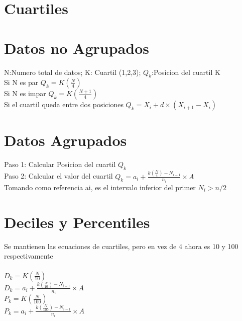 \documentclass[14pt]{extarticle}
\begin{document}
	\section*{\normalsize Cuartiles}
	\section*{\normalsize Datos no Agrupados}
	N:Numero total de datos; K: Cuartil (1,2,3); $Q_k$:Posicion del cuartil K\\
	Si N es par $Q_k = K(\frac{N}{4})$\\
	Si N es impar $Q_k = K(\frac{N+1}{4})$\\
	Si el cuartil queda entre dos posiciones $Q_k = X_i + d \times (X_{i+1} - X_{i})$
	
	\section*{\normalsize Datos Agrupados}
	Paso 1: Calcular Posicion del cuartil $Q_k$\\
	Paso 2: Calcular el valor del cuartil
	$Q_k = a_i + \frac{k(\frac{N}{4}) - N_{i-1}}{n_i} \times A$ \\
	Tomando como referencia ai, es el intervalo inferior del primer $N_i > n/2$
	\section*{\normalsize Deciles y Percentiles}
	Se mantienen las ecuaciones de cuartiles, pero en vez de 4 ahora es 10 y 100 respectivamente\\\\
	 $D_k = K(\frac{N}{10})$\\
	 	$D_k = a_i + \frac{k(\frac{N}{10}) - N_{i-1}}{n_i} \times A$\\
	 	$P_k = K(\frac{N}{100})$\\
	 	$P_k = a_i + \frac{k(\frac{N}{100}) - N_{i-1}}{n_i} \times A$
	
	
	

	
	
	
	
	
\end{document}
